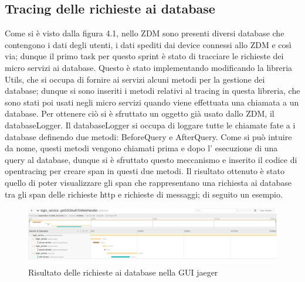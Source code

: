 \documentclass[a4paper,12pt,titlepage,italian,openany]{report}
\begin{document}
\subsection{Tracing delle richieste ai database}
Come si è visto dalla figura 4.1, nello ZDM\cite{zdm:1} sono presenti diversi database che contengono i dati degli utenti, i dati spediti dai device connessi allo ZDM\cite{zdm:1} e così via; dunque il primo task per questo sprint è stato di 
tracciare le richieste dei micro servizi ai database. Questo è stato implementando modificando la libreria Utils, che si occupa di fornire ai servizi alcuni
 metodi per la gestione dei database; 
dunque si sono inseriti i metodi relativi al tracing in questa libreria, che sono stati poi usati negli micro 
servizi quando viene effettuata una chiamata a un database. Per ottenere ciò si è sfruttato un oggetto già usato dallo ZDM\cite{zdm:1}, il databaseLogger. Il databaseLogger si occupa di loggare tutte le chiamate fate a i database definendo due metodi: BeforeQuery e AfterQuery. 
Come si può intuire da nome, questi metodi vengono chiamati prima e dopo l' esecuzione di una query al database, dunque si è sfruttato questo meccanismo e inserito il codice di opentracing per creare span in questi due metodi.
Il risultato ottenuto è stato quello di poter visualizzare gli span che rappresentano una richiesta ai database tra gli span delle richieste http e richieste di messaggi; di seguito un esempio.
\begin{figure}[H]
    \includegraphics[scale=0.4]{43.jpg}
    \centering
    \caption{Risultato delle richieste ai database nella GUI jaeger}
\end{figure}
\end{document}
